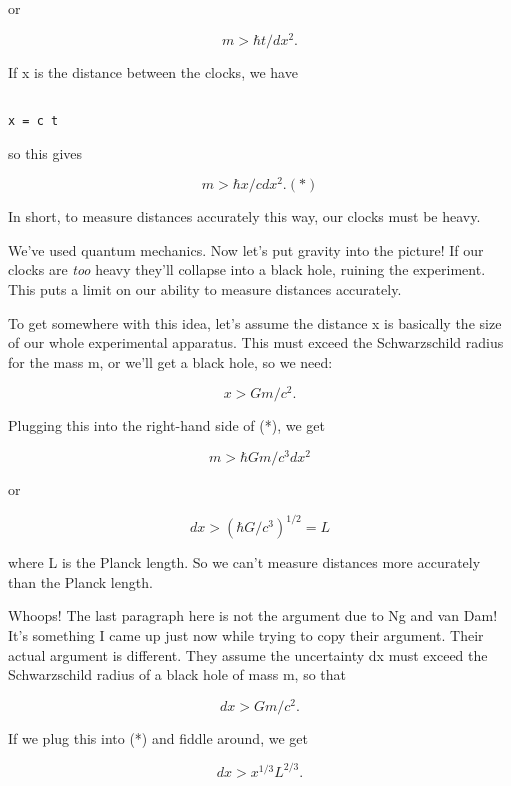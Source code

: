 or


$$

m > \hbar  t / dx^{2}.
$$
    
If x is the distance between the clocks, we have


\begin{verbatim}

x = c t 
\end{verbatim}
    
so this gives


$$

m > \hbar  x / c dx^{2}.                                   (*)
$$
    
In short, to measure distances accurately this way, our clocks
must be heavy.
 
We've used quantum mechanics.  Now let's put gravity into the picture!
If our clocks are \emph{too} heavy they'll collapse into a black hole,
ruining the experiment.  This puts a limit on our ability to measure
distances accurately.

To get somewhere with this idea, let's assume the distance x is
basically the size of our whole experimental apparatus.  This must
exceed the Schwarzschild radius for the mass m, or we'll get a 
black hole, so we need:


$$

x > G m / c^{2}.
$$
    
Plugging this into the right-hand side of (*), we get 


$$

m > \hbar  G m / c^{3} dx^{2}
$$
    
or 


$$

dx > (\hbar  G / c^{3})^{1/2} = L
$$
    
where L is the Planck length.  So we can't measure distances more
accurately than the Planck length.

Whoops!  The last paragraph here is not the argument due to Ng and van
Dam!  It's something I came up just now while trying to copy their
argument.  Their actual argument is different.  They assume the
uncertainty dx must exceed the Schwarzschild radius of a black hole of
mass m, so that


$$

dx > G m / c^{2}.
$$
    
If we plug this into (*) and fiddle around, we get


$$

dx > x^{1/3} L^{2/3}.
$$
    

